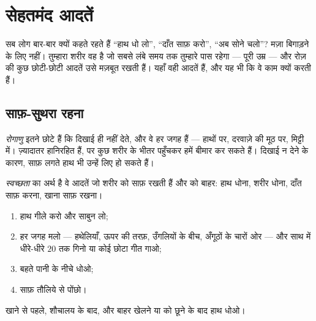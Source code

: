 \chapter{सेहतमंद आदतें}\label{ch:g1:healthy-habits}

सब लोग बार-बार क्यों कहते रहते हैं ``हाथ धो लो'', ``दाँत साफ़ करो'',
``अब सोने चलो''? मज़ा बिगाड़ने के लिए नहीं। तुम्हारा शरीर वह  है
जो सबसे लंबे समय तक तुम्हारे पास रहेगा --- पूरी उम्र --- और रोज़ की
कुछ छोटी-छोटी आदतें उसे मज़बूत रखती हैं। यहाँ वही आदतें हैं, और यह भी
कि वे काम क्यों करती हैं।

\section{साफ़-सुथरा रहना}

\begin{definition}[रोगाणु]\label{def:g1:healthy-habits:germs}
\emph{रोगाणु} इतने छोटे  हैं कि दिखाई ही नहीं देते,
और वे हर जगह हैं --- हाथों पर, दरवाज़े की मूठ पर, मिट्टी में।
ज़्यादातर हानिरहित हैं, पर कुछ शरीर के भीतर पहुँचकर हमें बीमार कर
सकते हैं। दिखाई न देने के कारण, साफ़ लगते हाथ भी उन्हें लिए हो सकते
हैं।
\end{definition}

\begin{definition}[स्वच्छता]\label{def:g1:healthy-habits:hygiene}
\emph{स्वच्छता} का अर्थ है वे आदतें जो शरीर को साफ़
रखती हैं और  को बाहर: हाथ धोना, शरीर धोना, दाँत साफ़ करना,
खाना साफ़ रखना।
\end{definition}

\begin{method}[हाथ ठीक से धोना]\label{met:g1:healthy-habits:hands}
\begin{enumerate}
  \item हाथ गीले करो और साबुन लो;
  \item हर जगह मलो --- हथेलियाँ, ऊपर की तरफ़, उँगलियों के बीच,
        अँगूठों के चारों ओर --- और साथ में धीरे-धीरे $20$ तक गिनो या
        कोई छोटा गीत गाओ;
  \item बहते पानी के नीचे धोओ;
  \item साफ़ तौलिये से पोंछो।
\end{enumerate}
खाने से पहले, शौचालय के बाद, और बाहर खेलने या  को छूने के बाद
हाथ धोओ।
\end{method}

